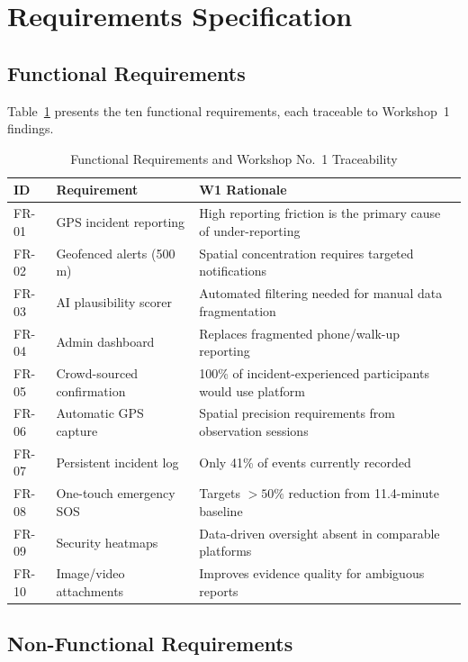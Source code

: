 \documentclass[11pt,a4paper]{article}
\begin{document}
\section{Requirements Specification}

\subsection{Functional Requirements}

Table~\ref{tab:fr} presents the ten functional requirements, each traceable to Workshop~1 findings.

\begin{table}[H]
\centering
\caption{Functional Requirements and Workshop No.\ 1 Traceability}
\label{tab:fr}
\small
\begin{tabularx}{\textwidth}{l l X}
\toprule
\textbf{ID} & \textbf{Requirement} & \textbf{W1 Rationale} \\
\midrule
FR-01 & GPS incident reporting & High reporting friction is the primary cause of under-reporting \\
FR-02 & Geofenced alerts (500\,m) & Spatial concentration requires targeted notifications \\
FR-03 & AI plausibility scorer & Automated filtering needed for manual data fragmentation \\
FR-04 & Admin dashboard & Replaces fragmented phone/walk-up reporting \\
FR-05 & Crowd-sourced confirmation & 100\% of incident-experienced participants would use platform \\
FR-06 & Automatic GPS capture & Spatial precision requirements from observation sessions \\
FR-07 & Persistent incident log & Only 41\% of events currently recorded \\
FR-08 & One-touch emergency SOS & Targets $>50\%$ reduction from 11.4-minute baseline \\
FR-09 & Security heatmaps & Data-driven oversight absent in comparable platforms \\
FR-10 & Image/video attachments & Improves evidence quality for ambiguous reports \\
\bottomrule
\end{tabularx}
\end{table}

\subsection{Non-Functional Requirements}
\end{document}
